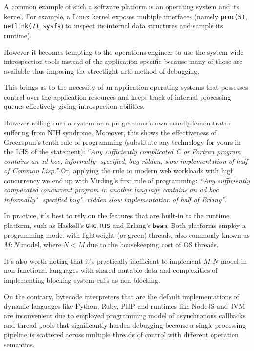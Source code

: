 \documentclass[10pt, a5paper]{article}
\begin{document}
A common example of such a software platform is an operating system and its kernel. For example, a Linux kernel exposes multiple interfaces (namely {\tt proc(5)}, {\tt netlink(7)}, {\tt sysfs}) to inspect its internal data structures and sample its runtime).

However it becomes tempting to the operations engineer to use the system-wide introspection tools instead of the application-specific because many of those are available thus imposing the {streetlight anti-method} of debugging.

This brings us to the necessity of an application operating systems that possesses control over the application resources and keeps track of internal processing queues effectively giving introspection abilities.

However rolling such a system on a programmer's own usually\linebreak demonstrates suffering from {NIH}  syndrome. Moreover, this shows the effectiveness of {Greenspun}'s tenth rule of programming (substitute any technology for yours in the LHS of the statement): \emph{``Any sufficiently complicated C or Fortran program contains an ad hoc, informally- \linebreak specified, bug-ridden, slow implementation of half of Common Lisp.''}
Or, applying the rule to modern web workloads with high concurrency we end up with {Virding}'{}s first rule of programming: \emph{``Any sufficiently complicated concurrent program in another language contains an ad hoc informally"=specified bug"=ridden slow implementation of half of Erlang''}.

In practice, it's best to rely on the features that are built-in to the runtime platform, such as Haskell's {\tt GHC RTS} and Erlang's {\tt beam}. Both platforms employ a programming model with lightweight (or green) threads, also commonly known as $ M:N $ model, where $ N < M $ due to the housekeeping cost of OS threads.

It's also worth noting that it's practically inefficient to implement $ M:N $ model in non-functional languages with shared mutable data and complexities of implementing blocking system calls as non-blocking.

On the contrary, bytecode interpreters that are the default implementations of dynamic languages like Python, Ruby, PHP and runtimes like NodeJS and JVM are inconvenient due to employed programming model of asynchronous callbacks and thread pools that significantly harden debugging because a single processing pipeline is scattered across multiple threads of control with different operation semantics.
\end{document}
